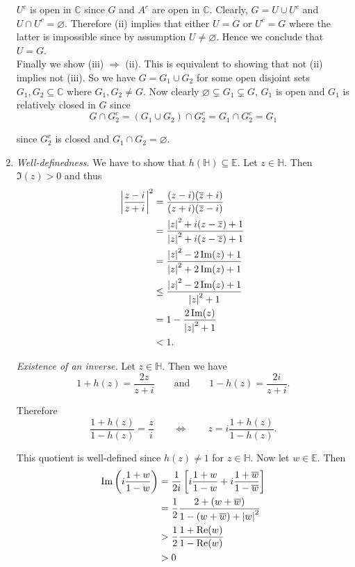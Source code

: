 \begin{enumerate}[label = \textbf{Exercise \arabic*.},wide = 0pt, itemsep=1.5ex]
	\noindent $U^c$ is open in $\mathbb{C}$ since $G$ and $A^c$ are open in $\mathbb{C}$. Clearly, $G = U \cup U^c$ and $U \cap U^c = \varnothing$. Therefore (ii) implies that either $U = G$ or $U^c = G$ where the latter is impossible since by assumption $U \neq \varnothing$. Hence we conclude that $U = G$.\\
	Finally we show (iii) $\Rightarrow$ (ii). This is equivalent to showing that not (ii) implies not (iii). So we have $G = G_1 \cup G_2$ for some open disjoint sets $G_1, G_2 \subseteq \mathbb{C}$ where $G_1,G_2 \neq G$. Now clearly $\varnothing \subsetneq G_1 \subsetneq G$, $G_1$ is open and $G_1$ is relatively closed in $G$ since
	\begin{equation*}
		G \cap G_2^c = (G_1 \cup G_2) \cap G_2^c = G_1 \cap G_2^c = G_1
	\end{equation*}

	\noindent since $G_2^c$ is closed and $G_1 \cap G_2 = \varnothing$.

\item
	\emph{Well-definedness.} We have to show that $h(\mathbb{H}) \subseteq \mathbb{E}$. Let $z \in \mathbb{H}$. Then $\Im(z) > 0$ and thus
	\begin{align*}
		\abs[3]{\frac{z - i}{z + i}}^2 &= \frac{(z - i)(\overline{z} + i)}{(z + i)(\overline{z} - i)}\\
		&= \frac{\abs[0]{z}^2 + i(z - \overline{z}) + 1}{\abs[0]{z}^2 + i(z - \overline{z}) + 1}\\
		&= \frac{\abs[0]{z}^2 -2 \Im (z) + 1}{\abs[0]{z}^2 + 2\Im(z) + 1}\\
		&\leq \frac{\abs[0]{z}^2 -2 \Im (z) + 1}{\abs[0]{z}^2 + 1}\\
		&= 1 - \frac{2\Im(z)}{\abs[0]{z}^2 + 1}\\
		& < 1.
	\end{align*}

	\emph{Existence of an inverse.} Let $z \in \mathbb{H}$. Then we have 
	\begin{equation}
		1 + h(z) = \frac{2z}{z + i} \qquad \text{and} \qquad 1 - h(z) = \frac{2i}{z + i}.
	\end{equation}

	Therefore
	\begin{equation}
		\frac{1 + h(z)}{1 - h(z)} = \frac{z}{i} \qquad \Leftrightarrow \qquad z = i\frac{1 + h(z)}{1 - h(z)}.
	\end{equation}

	This quotient is well-defined since $h(z) \neq 1$ for $z \in \mathbb{H}$. Now let $w \in \mathbb{E}$. Then
	\begin{align*}
		\Im\del[3]{i\frac{1 + w}{1 - w}} &= \frac{1}{2i}\sbr[3]{i\frac{1 + w}{1 - w} + i\frac{1 + \overline{w}}{1 - \overline{w}}}\\
		&= \frac{1}{2}\frac{2 + (w + \overline{w})}{1 - (w + \overline{w}) + \abs[0]{w}^2}\\
		&> \frac{1}{2}\frac{1 + \Re(w)}{1 - \Re(w)}\\
		&> 0
	\end{align*}


\end{enumerate}
